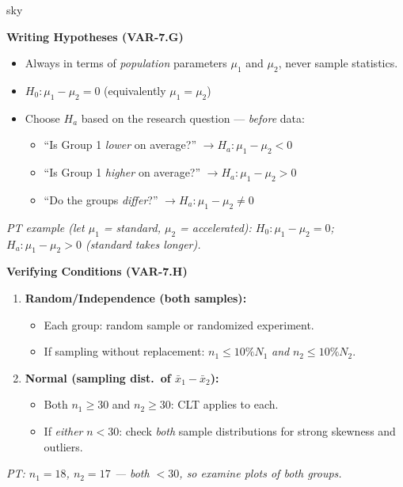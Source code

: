 \documentclass[10pt]{article}
\begin{document}
\begin{skillbox}{sky}
\begin{minipage}[t]{0.48\linewidth}
    \textbf{Writing Hypotheses (VAR-7.G)}
    \begin{itemize}
        \item Always in terms of \emph{population} parameters $\mu_1$ and $\mu_2$,
              never sample statistics.
        \item $H_0: \mu_1 - \mu_2 = 0$ \quad (equivalently $\mu_1 = \mu_2$)
        \item Choose $H_a$ based on the research question --- \emph{before} data:
              \begin{itemize}
                  \item ``Is Group 1 \emph{lower} on average?''
                        $\to H_a: \mu_1 - \mu_2 < 0$
                  \item ``Is Group 1 \emph{higher} on average?''
                        $\to H_a: \mu_1 - \mu_2 > 0$
                  \item ``Do the groups \emph{differ}?''
                        $\to H_a: \mu_1 - \mu_2 \ne 0$
              \end{itemize}
    \end{itemize}
    \textit{PT example (let $\mu_1$ = standard, $\mu_2$ = accelerated):
    $H_0: \mu_1 - \mu_2 = 0$; $H_a: \mu_1 - \mu_2 > 0$ (standard takes longer).}
\end{minipage}
\hfill
\begin{minipage}[t]{0.48\linewidth}
    \textbf{Verifying Conditions (VAR-7.H)}
    \begin{enumerate}
        \item \textbf{Random/Independence (both samples):}
              \begin{itemize}
                  \item Each group: random sample or randomized experiment.
                  \item If sampling without replacement: $n_1 \le 10\%N_1$
                        \emph{and} $n_2 \le 10\%N_2$.
              \end{itemize}
        \item \textbf{Normal (sampling dist.\ of $\bar x_1 - \bar x_2$):}
              \begin{itemize}
                  \item Both $n_1 \ge 30$ and $n_2 \ge 30$: CLT applies to each.
                  \item If \emph{either} $n < 30$: check \emph{both} sample
                        distributions for strong skewness and outliers.
              \end{itemize}
    \end{enumerate}
    \textit{PT: $n_1 = 18$, $n_2 = 17$ --- both $< 30$, so examine plots of
    \emph{both} groups.}
\end{minipage}
\end{skillbox}
\end{document}

